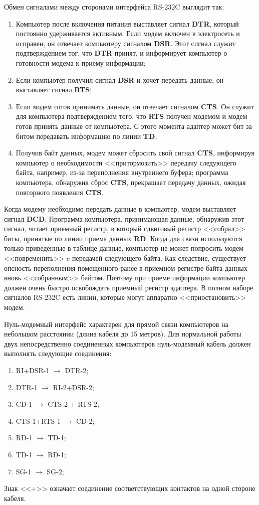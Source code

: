 \documentclass[russian,utf8,simple,emptystyle]{eskdtext}
\begin{document}
Обмен сигналами между сторонами интерфейса RS-232C выглядит так:
\begin{enumerate}
\item Компьютер после включения питания выставляет сигнал \textbf{DTR}, который постоянно удерживается активным. Если модем включен в электросеть и исправен, он отвечает компьютеру сигналом \textbf{DSR}. Этот сигнал служит подтверждением тог, что \textbf{DTR} принят, и информирует компьютер о готовности модема к приему информации;
\item Если компьютер получил сигнал \textbf{DSR} и хочет передать данные, он выставляет сигнал \textbf{RTS};
\item Если модем готов принимать данные, он отвечает сигналом \textbf{CTS}. Он служит для компьютера подтверждением того, что \textbf{RTS} получен модемом и модем готов принять данные от компьютера. С этого момента адаптер может бит за битом передавать информацию по линии \textbf{TD};
\item Получив байт данных, модем может сбросить свой сигнал \textbf{CTS}, информируя компьютер о необходимости <<притормозить>> передачу следующего байта, например, из-за переполнения внутреннего буфера; программа компьютера, обнаружив сброс \textbf{CTS}, прекращает передачу данных, ожидая повторного появления \textbf{CTS}.
\end{enumerate}

Когда модему необходимо передать данные в компьютер, модем выставляет сигнал  \textbf{DCD}. Программа компьютера, принимающая данные, обнаружив этот сигнал, читает приемный регистр, в который сдвиговый регистр <<собрал>> биты, принятые по линии приема данных \textbf{RD}. Когда для связи используются только приведенные в таблице данные, компьютер не может попросить модем <<повременить>> c передачей следующего байта. Как следствие, существует опсность переполнения помещенного ранее в приемном регистре байта данных вновь <<собранным>> байтом. Поэтому при приеме информации компьютер должен очень быстро освобождать приемный регистр адаптера. В полном наборе сигналов RS-232C есть линии, которые могут аппаратно <<приостановить>> модем.

Нуль-модемный интерфейс характерен для прямой связи компьютеров на небольшом расстоянии (длина кабеля до 15 метров). Для нормальной работы двух непосредственно соединенных компьютеров нуль-модемный кабель должен выполнять следующие соединения:
\begin{enumerate}
\item RI+DSR-1 $\rightarrow$ DTR-2;
\item DTR-1 $\rightarrow$ RI-2+DSR-2;
\item CD-1 $\rightarrow$ CTS-2 + RTS-2;
\item CTS-1+RTS-1 $\rightarrow$ CD-2;
\item RD-1 $\rightarrow$ TD-1;
\item TD-1 $\rightarrow$ RD-1;
\item SG-1 $\rightarrow$ SG-2;
\end{enumerate}
Знак <<+>> означает соединение соответствующих контактов на одной стороне кабеля.
\end{document}
